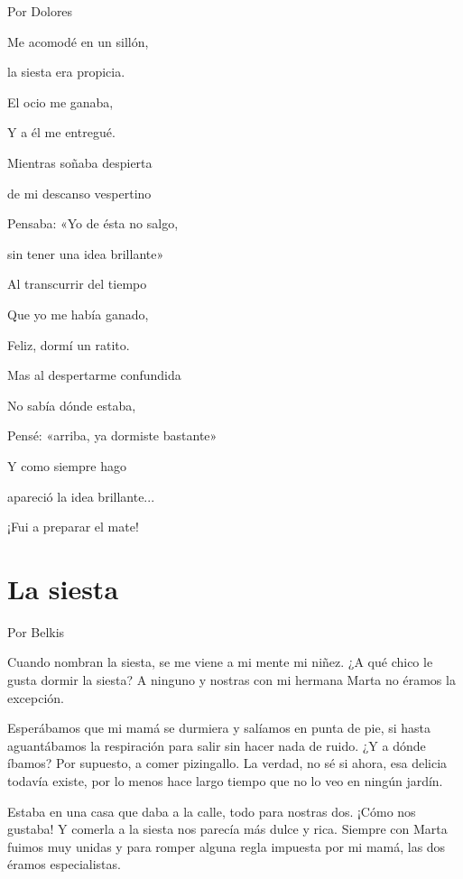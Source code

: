 \documentclass[11pt,twoside,openright,a5paper]{book}
\begin{document}
\begin{flushright}Por Dolores\end{flushright}

\begin{center}
Me acomodé en un sillón,

la siesta era propicia.

El ocio me ganaba,

Y a él me entregué.


Mientras soñaba despierta

de mi descanso vespertino

Pensaba: «Yo de ésta no salgo,

sin tener una idea brillante»


Al transcurrir del tiempo

Que yo me había ganado,

Feliz, dormí un ratito.



Mas al despertarme confundida

No sabía dónde estaba,

Pensé: «arriba, ya dormiste bastante»

Y como siempre hago

apareció la idea brillante...

¡Fui a preparar el mate!
\end{center}

\section*{La siesta}

                                                                                                             \begin{flushright}Por Belkis\end{flushright}

Cuando nombran la siesta, se me viene a mi mente mi niñez. ¿A qué chico le gusta dormir la siesta? A ninguno y nostras con mi hermana Marta no éramos la excepción.

Esperábamos que  mi mamá se durmiera y salíamos en punta de pie, si hasta aguantábamos la respiración para salir sin hacer nada de ruido. ¿Y a dónde íbamos? Por supuesto, a comer pizingallo. La verdad, no sé si ahora, esa delicia todavía existe, por lo menos hace largo tiempo que no lo veo en ningún jardín.

Estaba en una casa que daba a la calle, todo para nostras dos. ¡Cómo nos gustaba! Y comerla a la siesta nos parecía más dulce y rica. Siempre con Marta fuimos muy unidas y para romper alguna regla impuesta por mi mamá, las dos éramos especialistas.
\end{document}
